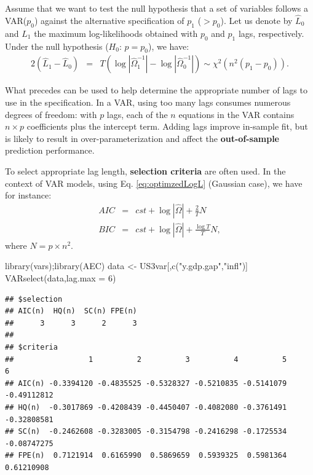 \documentclass[
  12pt,
]{book}
\newenvironment{Shaded}{\begin{snugshade}}{\end{snugshade}}
\newcommand{\AttributeTok}[1]{\textcolor[rgb]{0.77,0.63,0.00}{#1}}
\newcommand{\DecValTok}[1]{\textcolor[rgb]{0.00,0.00,0.81}{#1}}
\newcommand{\FunctionTok}[1]{\textcolor[rgb]{0.00,0.00,0.00}{#1}}
\newcommand{\NormalTok}[1]{#1}
\newcommand{\OtherTok}[1]{\textcolor[rgb]{0.56,0.35,0.01}{#1}}
\newcommand{\StringTok}[1]{\textcolor[rgb]{0.31,0.60,0.02}{#1}}
\theoremstyle{definition}
\theoremstyle{definition}
\theoremstyle{definition}
\theoremstyle{definition}
\theoremstyle{remark}
\begin{document}
Assume that we want to test the null hypothesis that a set of variables follows a VAR(\(p_{0}\)) against the alternative specification of \(p_{1}\) (\(>p_{0}\)). Let us denote by \(\hat{L}_{0}\) and \(\hat{L}_{1}\) the maximum log-likelihoods obtained with \(p_{0}\) and \(p_{1}\) lags, respectively. Under the null hypothesis (\(H_0\): \(p=p_0\)), we have:
\begin{eqnarray*}
2\left(\hat{L}_{1}-\hat{L}_{0}\right)&=&T\left(\log\left|\hat{\Omega}_{1}^{-1}\right|-\log\left|\hat{\Omega}_{0}^{-1}\right|\right)  \sim \chi^2(n^{2}(p_{1}-p_{0})).
\end{eqnarray*}

What precedes can be used to help determine the appropriate number of lags to use in the specification. In a VAR, using too many lags consumes numerous degrees of freedom: with \(p\) lags, each of the \(n\) equations in the VAR contains \(n\times p\) coefficients plus the intercept term. Adding lags improve in-sample fit, but is likely to result in over-parameterization and affect the \textbf{out-of-sample} prediction performance.

To select appropriate lag length, \textbf{selection criteria} are often used. In the context of VAR models, using Eq. \eqref{eq:optimzedLogL} (Gaussian case), we have for instance:
\begin{eqnarray*}
AIC & = & cst + \log\left|\hat{\Omega}\right|+\frac{2}{T}N\\
BIC & = & cst + \log\left|\hat{\Omega}\right|+\frac{\log T}{T}N,
\end{eqnarray*}
where \(N=p \times n^{2}\).

\begin{Shaded}
\begin{Highlighting}[]
\FunctionTok{library}\NormalTok{(vars);}\FunctionTok{library}\NormalTok{(AEC)}
\NormalTok{data }\OtherTok{\textless{}{-}}\NormalTok{ US3var[,}\FunctionTok{c}\NormalTok{(}\StringTok{"y.gdp.gap"}\NormalTok{,}\StringTok{"infl"}\NormalTok{)]}
\FunctionTok{VARselect}\NormalTok{(data,}\AttributeTok{lag.max =} \DecValTok{6}\NormalTok{)}
\end{Highlighting}
\end{Shaded}

\begin{verbatim}
## $selection
## AIC(n)  HQ(n)  SC(n) FPE(n) 
##      3      3      2      3 
## 
## $criteria
##                 1          2          3          4          5           6
## AIC(n) -0.3394120 -0.4835525 -0.5328327 -0.5210835 -0.5141079 -0.49112812
## HQ(n)  -0.3017869 -0.4208439 -0.4450407 -0.4082080 -0.3761491 -0.32808581
## SC(n)  -0.2462608 -0.3283005 -0.3154798 -0.2416298 -0.1725534 -0.08747275
## FPE(n)  0.7121914  0.6165990  0.5869659  0.5939325  0.5981364  0.61210908
\end{verbatim}
\end{document}
